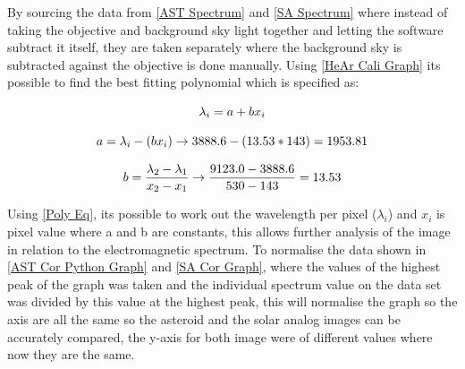 \documentclass[12pt]{article}
\begin{document}
By sourcing the data from \cref{AST Spectrum} and \cref{SA Spectrum} where instead of taking the objective and background sky light together and letting the software subtract it itself, they are taken separately where the background sky is subtracted against the objective is done manually. Using \cref{HeAr Cali Graph} its possible to find the best fitting polynomial which is specified as:

\begin{equation}
\centering
\lambda_i= a + b x_i 
\label{Poly Eq}
\end{equation} 

\begin{equation}
\centering
a = \lambda_i - (b x_i) \rightarrow 3888.6 - (13.53 * 143) = 1953.81
\label{Poly Eq a}
\end{equation} 

\begin{equation}
\centering
b = \dfrac{\lambda_2 - \lambda_1}{x_2 - x_1} \rightarrow \dfrac{9123.0 - 3888.6}{530 - 143} = 13.53
\label{Poly Eq b}
\end{equation} 
\vspace{0.5cm}

Using \cref{Poly Eq}, its possible to work out the wavelength per pixel ($\lambda_i$) and $x_i$ is pixel value where a and b are constants, this allows further analysis of the image in relation to the electromagnetic spectrum. To normalise the data shown in \cref{AST Cor Python Graph} and \cref{SA Cor Graph}, where the values of the highest peak of the graph was taken and the individual spectrum value on the data set was divided by this value at the highest peak, this will normalise the graph so the axis are all the same so the asteroid and the solar analog images can be accurately compared, the y-axis for both image were of different values where now they are the same. \\
\end{document}
